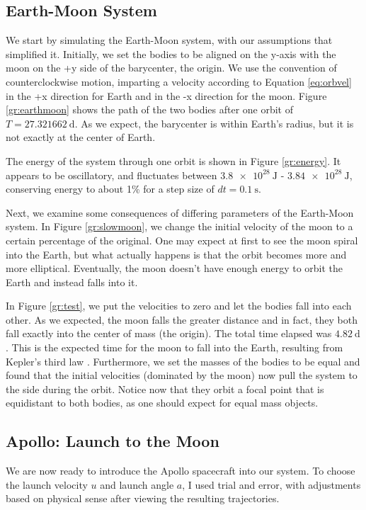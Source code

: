 \documentclass[aps,prl,twocolumn,superscriptaddress]{revtex4-1}
\begin{document}
\subsection{Earth-Moon System}
We start by simulating the Earth-Moon system, with our assumptions that simplified it. Initially, we set the bodies to be aligned on the y-axis with the moon on the +y side of the barycenter, the origin. We use the convention of counterclockwise motion, imparting a velocity according to Equation \ref{eq:orbvel} in the +x direction for Earth and in the -x direction for the moon. Figure \ref{gr:earthmoon} shows the path of the two bodies after one orbit of $T = \SI{27.321662}{\day}$. As we expect, the barycenter is within Earth's radius, but it is not exactly at the center of Earth.

The energy of the system through one orbit is shown in Figure \ref{gr:energy}. It appears to be oscillatory, and fluctuates between $\SI{3.8e28}{\joule}$ - $\SI{3.84e28}{\joule}$, conserving energy to about 1\% for a step size of $dt = \SI{0.1}{\s}$. 

Next, we examine some consequences of differing parameters of the Earth-Moon system. In Figure \ref{gr:slowmoon}, we change the initial velocity of the moon to a certain percentage of the original. One may expect at first to see the moon spiral into the Earth, but what actually happens is that the orbit becomes more and more elliptical. Eventually, the moon doesn't have enough energy to orbit the Earth and instead falls into it. 

In Figure \ref{gr:test}, we put the velocities to zero and let the bodies fall into each other. As we expected, the moon falls the greater distance and in fact, they both fall exactly into the center of mass (the origin). The total time elapsed was $\SI{4.82}{\day}$. This is the expected time for the moon to fall into the Earth, resulting from Kepler's third law \cite{phys}. Furthermore, we set the masses of the bodies to be equal and found that  the initial velocities (dominated by the moon) now pull the system to the side during the orbit. Notice now that they orbit a focal point that is equidistant to both bodies, as one should expect for equal mass objects.

\subsection{Apollo: Launch to the Moon}
We are now ready to introduce the Apollo spacecraft into our system. To choose the launch velocity $u$ and launch angle $a$, I used trial and error, with adjustments based on physical sense after viewing the resulting trajectories. 
\end{document}
